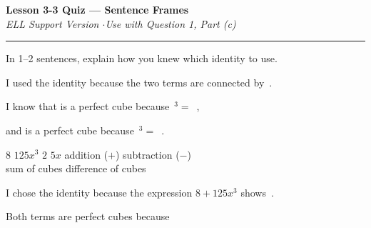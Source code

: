 \documentclass[11pt]{article}
\newcommand{\blank}[1][2cm]{\underline{\hspace{#1}}}
\begin{document}
\newpage


\begin{center}
{\LARGE\bfseries Lesson 3-3 Quiz --- Sentence Frames}\\[4pt]
{\small\itshape ELL Support Version \quad$\cdot$\quad Use with Question 1, Part (c)}
\end{center}

\vspace{4pt}
\noindent\rule{\linewidth}{1.5pt}
\vspace{10pt}

 In 1--2 sentences, explain how you knew which identity to use.

\vspace{12pt}

\begin{tcolorbox}[sentenceframe={Option A --- Fill in the Blanks}]
\vspace{4pt}

I used the \blank[3.5cm] identity because the two terms are connected by \blank[2.5cm]\,.

\vspace{14pt}
I know that \blank[1.5cm] is a perfect cube because \blank[1.5cm]$\,^3 = $ \blank[1.5cm]\,, 

\vspace{14pt}
and \blank[2cm] is a perfect cube because \blank[1.5cm]$\,^3 = $ \blank[2cm]\,.

\vspace{6pt}
\end{tcolorbox}

\vspace{6pt}

\begin{tcolorbox}[wordbank]
$8$ \qquad $125x^3$ \qquad $2$ \qquad $5x$ \qquad addition ($+$) \qquad subtraction ($-$)\\[4pt]
sum of cubes \qquad difference of cubes
\end{tcolorbox}

\vspace{16pt}

\begin{tcolorbox}[sentenceframe={Option B --- Sentence Starters}]
\vspace{4pt}

I chose the \blank[5cm] identity because the expression $8 + 125x^3$ shows \blank[5cm]\,.

\vspace{14pt}
Both terms are perfect cubes because \rule{0pt}{12pt}\hrulefill

\vspace{14pt}
\hrulefill

\vspace{6pt}
\end{tcolorbox}
\end{document}
